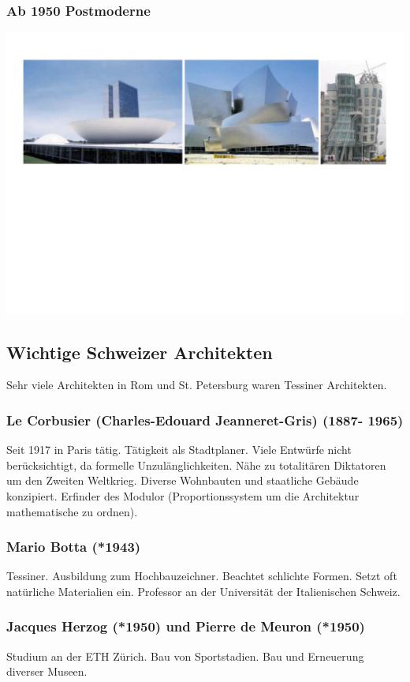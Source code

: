 \documentclass[10pt, openright=true]{scrartcl}
\begin{document}
\subsubsection{Ab 1950 Postmoderne}
\includegraphics[width=1\textwidth]{images/postmoderne}
\subsection{Wichtige Schweizer Architekten}
Sehr viele Architekten in Rom und St. Petersburg waren Tessiner Architekten.
\subsubsection{Le Corbusier (Charles-Edouard Jeanneret-Gris) (1887- 1965)}
Seit 1917 in Paris tätig. Tätigkeit als Stadtplaner. Viele Entwürfe nicht berücksichtigt, da formelle Unzulänglichkeiten. Nähe zu totalitären Diktatoren um den Zweiten Weltkrieg. Diverse Wohnbauten und staatliche Gebäude konzipiert. Erfinder des Modulor (Proportionssystem um die Architektur mathematische zu ordnen).
\subsubsection{Mario Botta (*1943)}
Tessiner. Ausbildung zum Hochbauzeichner. Beachtet schlichte Formen. Setzt oft natürliche Materialien ein. Professor an der Universität der Italienischen Schweiz.
\subsubsection{Jacques Herzog (*1950) und Pierre de Meuron (*1950)}
Studium an der ETH Zürich. Bau von Sportstadien. Bau und Erneuerung diverser Museen.
\end{document}
